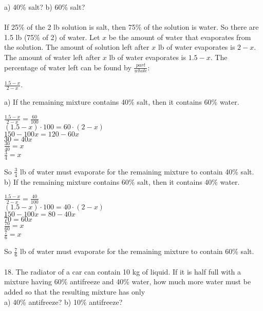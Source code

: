\documentclass[12pt]{article}
\begin{document}
a) 40\% salt? \hspace{5cm} b) 60\% salt? \\
\\
If 25\% of the 2 lb solution is salt, then 75\% of the solution is water. So there are 1.5 lb (75\% of 2) of water. Let $x$ be the amount of water that evaporates from the solution. The amount of solution left after $x$ lb of water evaporates is $2-x$. The amount of water left after $x$ lb of water evaporates is $1.5-x$. The percentage of water left can be found by $\displaystyle \frac{part}{whole}$:
\begin{center}
$\displaystyle \frac{1.5-x}{2-x}$.
\end{center}
a) If the remaining mixture contains 40\% salt, then it contains 60\% water.
\begin{center}
$\displaystyle \frac{1.5-x}{2-x}=\displaystyle \frac{60}{100}$ \\
$(1.5-x)\cdot100=60\cdot(2-x)$ \\
$150-100x=120-60x$ \\
$30=40x$ \\
$\displaystyle \frac{30}{40}=x$ \\
$\displaystyle \frac{3}{4}=x$
\end{center}
So $\displaystyle \frac{3}{4}$ lb of water must evaporate for the remaining mixture to contain 40\% salt. \\
b) If the remaining mixture contains 60\% salt, then it contains 40\% water.
\begin{center}
$\displaystyle \frac{1.5-x}{2-x}=\displaystyle \frac{40}{100}$ \\
$(1.5-x)\cdot100=40\cdot(2-x)$ \\
$150-100x=80-40x$ \\
$70=60x$ \\
$\displaystyle \frac{70}{60}=x$ \\
$\displaystyle \frac{7}{6}=x$
\end{center}
So $\displaystyle \frac{7}{6}$ lb of water must evaporate for the remaining mixture to contain 60\% salt. \\
\\
18. The radiator of a car can contain 10 kg of liquid. If it is half full with a mixture having 60\% antifreeze and 40\% water, how much more water must be added so that the resulting mixture has only \\
a) 40\% antifreeze? \hspace{3cm} b) 10\% antifreeze? \\
\end{document}
